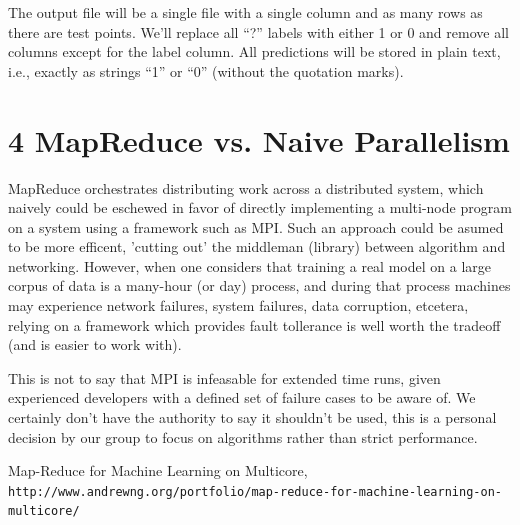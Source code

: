 \documentclass{neu_handout}
\begin{document}
The output file will be a single file with a single column and as many rows as there are test points. We'll replace all “?” labels with either 1 or 0 and remove all columns except for the label column. All predictions will be stored in plain text, i.e., exactly as strings “1” or “0” (without the quotation marks).

\section*{4 MapReduce vs. Naive Parallelism}
MapReduce orchestrates distributing work across a distributed system, which naively could be eschewed in favor of directly implementing a multi-node program on a system using a framework such as MPI. Such an approach could be asumed to be more efficent, 'cutting out' the middleman (library) between algorithm and networking. However, when one considers that training a real model on a large corpus of data is a many-hour (or day) process, and during that process machines may experience network failures, system failures, data corruption, etcetera, relying on a framework which provides fault tollerance is well worth the tradeoff (and is easier to work with).

This is not to say that MPI is infeasable for extended time runs, given experienced developers with a defined set of failure cases to be aware of. We certainly don't have the authority to say it shouldn't be used, this is a personal decision by our group to focus on algorithms rather than strict performance.

\begin{thebibliography}{9}
Map-Reduce for Machine Learning on Multicore,
\\\texttt{http://www.andrewng.org/portfolio/map-reduce-for-machine-learning-on-multicore/}
\end{thebibliography}
\end{document}
